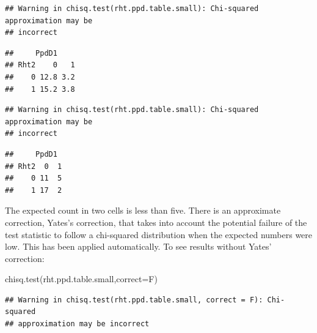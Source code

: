 \documentclass[
]{book}
\newenvironment{Shaded}{\begin{snugshade}}{\end{snugshade}}
\newcommand{\AttributeTok}[1]{\textcolor[rgb]{0.77,0.63,0.00}{#1}}
\newcommand{\FunctionTok}[1]{\textcolor[rgb]{0.00,0.00,0.00}{#1}}
\newcommand{\NormalTok}[1]{#1}
\newcommand{\SpecialCharTok}[1]{\textcolor[rgb]{0.00,0.00,0.00}{#1}}
\begin{document}
\begin{Shaded}
\end{Shaded}

\begin{verbatim}
## Warning in chisq.test(rht.ppd.table.small): Chi-squared approximation may be
## incorrect
\end{verbatim}

\begin{verbatim}
##     PpdD1
## Rht2    0   1
##    0 12.8 3.2
##    1 15.2 3.8
\end{verbatim}

\begin{Shaded}
\end{Shaded}

\begin{verbatim}
## Warning in chisq.test(rht.ppd.table.small): Chi-squared approximation may be
## incorrect
\end{verbatim}

\begin{verbatim}
##     PpdD1
## Rht2  0  1
##    0 11  5
##    1 17  2
\end{verbatim}

The expected count in two cells is less than five. There is an approximate correction, Yates's correction, that takes into account the potential failure of the test statistic to follow a chi-squared distribution when the expected numbers were low. This has been applied automatically. To see results without Yates' correction:

\begin{Shaded}
\begin{Highlighting}[]
\FunctionTok{chisq.test}\NormalTok{(rht.ppd.table.small,}\AttributeTok{correct=}\NormalTok{F)}
\end{Highlighting}
\end{Shaded}

\begin{verbatim}
## Warning in chisq.test(rht.ppd.table.small, correct = F): Chi-squared
## approximation may be incorrect
\end{verbatim}
\end{document}
